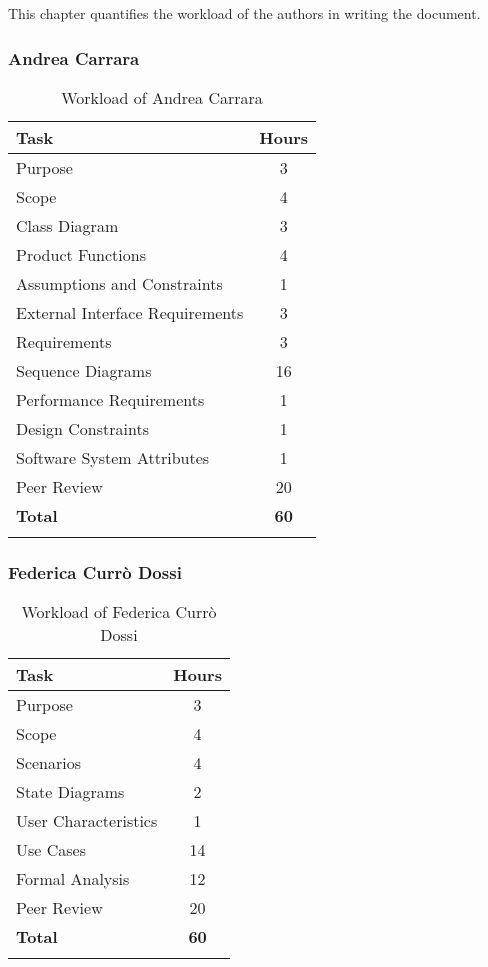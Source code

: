 This chapter quantifies the workload of the authors in writing the document.

\subsubsection{Andrea Carrara}
\renewcommand{\arraystretch}{1.5}
\begin{longtable}{|p{8.5cm}|c|}
    \hline \rowcolor{polimiblue!40}
    \textbf{Task} & \textbf{Hours} \\ \hline
    Purpose & 3 \\ \hline
    Scope & 4 \\ \hline
    Class Diagram & 3 \\ \hline
    Product Functions & 4 \\ \hline
    Assumptions and Constraints & 1 \\ \hline
    External Interface Requirements & 3 \\ \hline
    Requirements & 3 \\ \hline
    Sequence Diagrams & 16 \\ \hline
    Performance Requirements & 1 \\ \hline
    Design Constraints & 1 \\ \hline
    Software System Attributes & 1 \\ \hline
    Peer Review & 20 \\ \hline
    \hline \rowcolor{polimiblue!40}
    \textbf{Total} & \textbf{60} \\ \hline
\caption{Workload of Andrea Carrara}
\end{longtable}

\subsubsection{Federica Currò Dossi}
\renewcommand{\arraystretch}{1.5}
\begin{longtable}{|p{8.5cm}|c|}
    \hline \rowcolor{polimiblue!40}
    \textbf{Task} & \textbf{Hours} \\ \hline
    Purpose & 3 \\ \hline
    Scope & 4 \\ \hline
    Scenarios & 4 \\ \hline
    State Diagrams & 2 \\ \hline
    User Characteristics & 1 \\ \hline
    Use Cases & 14 \\ \hline
    Formal Analysis & 12 \\ \hline
    Peer Review & 20 \\ \hline
    \hline \rowcolor{polimiblue!40}
    \textbf{Total} & \textbf{60} \\ \hline
\caption{Workload of Federica Currò Dossi}
\end{longtable}

